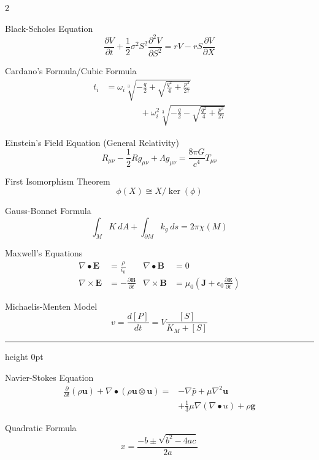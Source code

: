 \multicolsep=0pt\relax
\bigskip
\begin{multicols*}{2}

Black-Scholes Equation
\[
\frac{\partial V}{\partial t}+
  \frac12\sigma^2S^2\frac{\partial^2V}{\partial S^2}
  =rV-rS\frac{\partial V}{\partial X}
\]

\vfill

Cardano's Formula/Cubic Formula
\begin{align*}
t_i&=\omega_i\sqrt[3]{-\frac q2+\sqrt{\frac{q^2}4+\frac{p^3}{27}}}\\
  &\qquad\qquad{}+\omega_i^2\sqrt[3]{-\frac q2-\sqrt{\frac{q^2}4+\frac{p^3}{27}}}
\end{align*}

\vfill

Einstein's Field Equation (General Relativity)
\[
R_{\mu\nu}-\frac12Rg_{\mu\nu}+\Lambda g_{\mu\nu}=\frac{8\pi G}{c^4}T_{\mu\nu}
\]

\vfill

First Isomorphism Theorem
\[
\phi(X)\cong X/\ker(\phi)
\]

\vfill

Gauss-Bonnet Formula
\[
\int_MK\ dA+\int_{\partial M}k_g\ ds=2\pi\chi(M)
\]

\vfill

Maxwell's Equations
\begin{align*}
\nabla\bullet\mathbf E&=\frac\rho{\epsilon_0}&
\nabla\bullet\mathbf B&=0\\
\nabla\times\mathbf E&=-\frac{\partial\mathbf B}{\partial t}&
\nabla\times\mathbf B&=\mu_0\left(\mathbf J+
  \epsilon_0\frac{\partial\mathbf E}{\partial t}\right)
\end{align*}

\vfill

Michaelis-Menten Model
\bgroup
\belowdisplayskip=0pt\relax
\belowdisplayshortskip=0pt\relax
\[
v=\frac{d[P]}{dt}=V\frac{[S]}{K_M+[S]}
\]
\par\egroup
\hrule height 0pt
\columnbreak

Navier-Stokes Equation
\begin{align*}
\frac{\partial}{\partial t}(\rho\mathbf{u})+\nabla\bullet
  (\rho \mathbf{u}\otimes \mathbf{u})={}
  &{-}\nabla\bar p+\mu\nabla^2\mathbf{u}\\
  &+\frac13\mu\nabla(\nabla\bullet u)+
  \rho\mathbf{g}
\end{align*}

\vfill

Quadratic Formula
\[
x=\frac{-b\pm\sqrt{b^2-4ac}}{2a}
\]


\end{multicols*}
